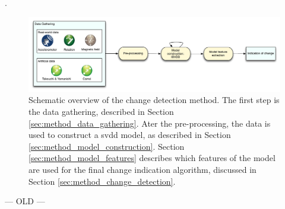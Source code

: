 
.

\begin{figure}
  \centering
    \includegraphics[width=\textwidth,height=\textheight,keepaspectratio]{./Figures/chapter4/method_setup_short.pdf}
  \caption[Method setup]{Schematic overview of the change detection method. The first step is the data gathering, described in Section \ref{sec:method_data_gathering}. Ater the pre-processing, the data is used to construct a \gls{svdd} model, as described in Section \ref{sec:method_model_construction}. Section \ref{sec:method_model_features} describes which features of the model are used for the final change indication algorithm, discussed in Section \ref{sec:method_change_detection}.}
  \label{fig:method_overview_short}
\end{figure}






 --- OLD ---



